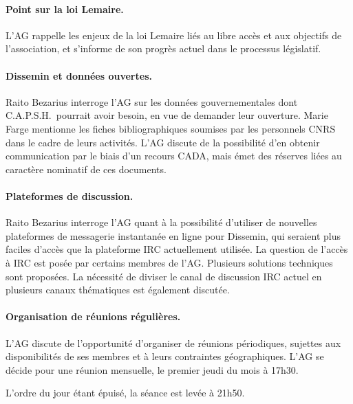 \documentclass{scrartcl}
\begin{document}
\paragraph{Point sur la loi Lemaire.}
L'AG rappelle les enjeux de la loi Lemaire liés au libre accès et aux objectifs
de l'association, et s'informe de son progrès actuel dans le processus
législatif.

\paragraph{Dissemin et données ouvertes.}
Raito Bezarius interroge l'AG sur les données gouvernementales dont C.A.P.S.H.\
pourrait avoir besoin, en vue de demander leur ouverture. Marie Farge mentionne
les fiches bibliographiques soumises par les personnels CNRS dans le cadre de
leurs activités. L'AG discute de la
possibilité d'en obtenir communication par le biais d'un recours CADA, mais émet
des réserves liées au caractère nominatif de ces documents.

\paragraph{Plateformes de discussion.}
Raito Bezarius interroge l'AG quant à la possibilité d'utiliser de nouvelles
plateformes de messagerie instantanée en ligne pour Dissemin, qui
seraient plus faciles d'accès que la plateforme IRC actuellement utilisée. La
question de l'accès à IRC est posée par certains membres de l'AG. Plusieurs
solutions techniques sont proposées. La nécessité de diviser le canal de
discussion IRC actuel en plusieurs canaux thématiques est également discutée.

\paragraph{Organisation de réunions régulières.}
L'AG discute de l'opportunité d'organiser de réunions périodiques, sujettes aux
disponibilités de ses membres et à leurs contraintes géographiques. L'AG se
décide pour une réunion mensuelle, le premier jeudi du mois à 17h30.

\bigskip

L'ordre du jour étant épuisé, la séance est levée à 21h50.
\end{document}
